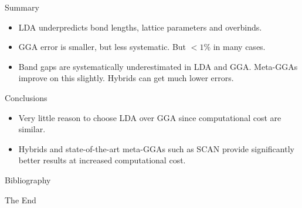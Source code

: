 \documentclass[aspectratio=169]{beamer}
\begin{document}
\begin{frame}{Summary}
\begin{itemize}
    \item LDA underpredicts bond lengths, lattice parameters and overbinds.
    \item GGA error is smaller, but less systematic. But $< 1$\% in many cases.
    \item Band gaps are systematically underestimated in LDA and GGA. Meta-GGAs improve on this slightly. Hybrids can get much lower errors.
\end{itemize}

\begin{alertblock}{Conclusions}
\begin{itemize}
\item Very little reason to choose LDA over GGA since computational cost are similar.
\item Hybrids and state-of-the-art meta-GGAs such as SCAN provide significantly better results at increased computational cost.
\end{itemize}

\end{alertblock}

\end{frame} 


\begin{frame}[allowframebreaks]{Bibliography}
    
    
\end{frame}



\begin{frame}
    \Huge{\centerline{The End}}
\end{frame}
\end{document}
